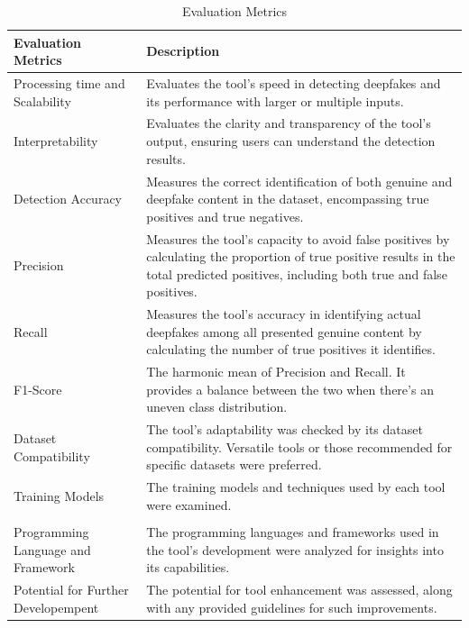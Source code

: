 \begin{table}[htpb]
	\caption{Evaluation Metrics}\label{tab:evaluation_metrics}
	\centering
	\small
	\begin{tabularx}{\textwidth}{l X}
		\toprule
		\textbf{Evaluation Metrics}         & \textbf{Description}                              \\
		\midrule
		Processing time and Scalability     & Evaluates the tool's speed in detecting deepfakes
		and its performance with larger or multiple inputs.                                     \\
		\addlinespace
		Interpretability                    & Evaluates the clarity and transparency of the
		tool's output, ensuring users can understand the detection results.                     \\
		\addlinespace
		Detection Accuracy                  & Measures the correct identification of both
		genuine and deepfake content in the dataset, encompassing true positives and true
		negatives.                                                                              \\
		\addlinespace
		Precision                           & Measures the tool's capacity to avoid false
		positives by calculating the proportion of true positive results in the total
		predicted positives, including both true and false positives.                           \\
		\addlinespace
		Recall                              & Measures the tool's accuracy in identifying
		actual deepfakes among all presented genuine content by calculating the number
		of true positives it identifies.                                                        \\
		\addlinespace
		F1-Score                            & The harmonic mean of Precision and Recall.
		It provides a balance between the two when there's an uneven class distribution.        \\
		\addlinespace
		Dataset Compatibility               & The tool's adaptability was checked by its
		dataset compatibility. Versatile tools or those recommended for specific datasets
		were preferred.                                                                         \\
		\addlinespace
		Training Models                     & The training models and techniques used by
		each tool were examined.                                                                \\                                             \\
		\addlinespace
		Programming Language and Framework  & The programming languages and frameworks used
		in the tool's development were analyzed for insights into its capabilities.             \\
		\addlinespace
		Potential for Further Developempent & The potential for tool enhancement was assessed,
		along with any provided guidelines for such improvements.                               \\
		\bottomrule
	\end{tabularx}
\end{table}

